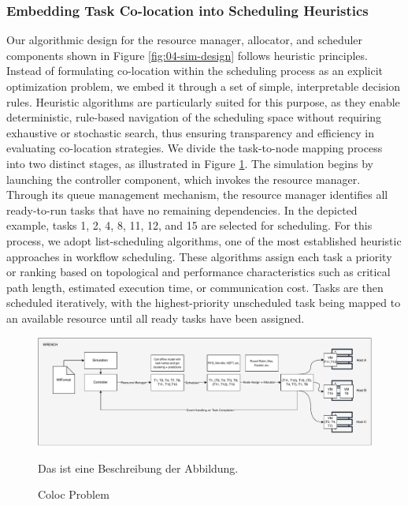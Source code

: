 \subsubsection{Embedding Task Co-location into Scheduling Heuristics}
\label{sec:heuristic_design}

Our algorithmic design for the resource manager, allocator, and scheduler components shown in Figure \ref{fig:04-sim-design} follows heuristic principles. Instead of formulating co-location within the scheduling process as an explicit optimization problem, we embed it through a set of simple, interpretable decision rules. Heuristic algorithms are particularly suited for this purpose, as they enable deterministic, rule-based navigation of the scheduling space without requiring exhaustive or stochastic search, thus ensuring transparency and efficiency in evaluating co-location strategies. We divide the task-to-node mapping process into two distinct stages, as illustrated in Figure \ref{fig:04-coloc-problem}. The simulation begins by launching the controller component, which invokes the resource manager. Through its queue management mechanism, the resource manager identifies all ready-to-run tasks that have no remaining dependencies. In the depicted example, tasks 1, 2, 4, 8, 11, 12, and 15 are selected for scheduling. For this process, we adopt list-scheduling algorithms, one of the most established heuristic approaches in workflow scheduling. These algorithms assign each task a priority or ranking based on topological and performance characteristics such as critical path length, estimated execution time, or communication cost. Tasks are then scheduled iteratively, with the highest-priority unscheduled task being mapped to an available resource until all ready tasks have been assigned.

\begin{figure}[H]
    \centering
    \includegraphics[scale=0.45]{fig/04/04-coloc-problem.pdf}
    \small
    \caption{Coloc Problem}
    \label{fig:04-coloc-problem}
    \tiny
    Das ist eine Beschreibung der Abbildung.
\end{figure}

